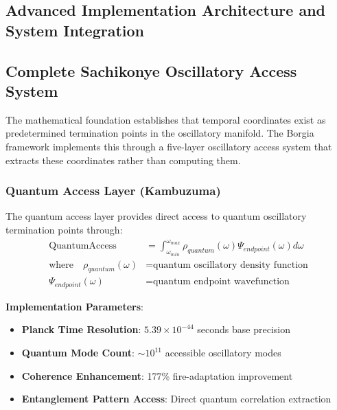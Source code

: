 ﻿\documentclass[11pt,a4paper]{article}
\begin{document}
\begin{itemize}
\begin{itemize}
\section{Advanced Implementation Architecture and System Integration}

\subsection{Complete Sachikonye Oscillatory Access System}

The mathematical foundation establishes that temporal coordinates exist as predetermined termination points in the oscillatory manifold. The Borgia framework implements this through a five-layer oscillatory access system that extracts these coordinates rather than computing them.

\subsubsection{Quantum Access Layer (Kambuzuma)}

\begin{definition}
The quantum access layer provides direct access to quantum oscillatory termination points through:
\begin{align}
\text{QuantumAccess} &= \int_{\omega_{min}}^{\omega_{max}} \rho_{quantum}(\omega) \Psi_{endpoint}(\omega) d\omega \\
\text{where} \quad \rho_{quantum}(\omega) &= \text{quantum oscillatory density function} \\
\Psi_{endpoint}(\omega) &= \text{quantum endpoint wavefunction}
\end{align}
\end{definition}

\textbf{Implementation Parameters}:
\begin{itemize}
\item \textbf{Planck Time Resolution}: $5.39 \times 10^{-44}$ seconds base precision
\item \textbf{Quantum Mode Count}: $\sim 10^{11}$ accessible oscillatory modes
\item \textbf{Coherence Enhancement}: 177\% fire-adaptation improvement
\item \textbf{Entanglement Pattern Access}: Direct quantum correlation extraction
\end{itemize}


\end{itemize}
\end{itemize}
\end{document}
